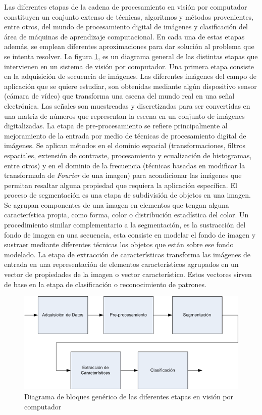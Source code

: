 \indent Las diferentes etapas de la cadena de procesamiento en visión por computador constituyen un conjunto extenso de técnicas, algoritmos y métodos provenientes, entre otros, del mundo de procesamiento digital de imágenes y clasificación del área de máquinas de aprendizaje computacional. En cada una de estas etapas además, se emplean diferentes aproximaciones para dar solución al problema que se intenta resolver. La figura \ref{fig:etapas_vision_computador}, es un diagrama general de las distintas etapas que intervienen en un sistema de visión por computador. Una primera etapa consiste en la adquisición de secuencia de imágenes. Las diferentes imágenes del campo de aplicación que se quiere estudiar, son obtenidas mediante algún dispositivo sensor (cámara de vídeo) que transforma una escena del mundo real en una señal electrónica. Las señales son muestreadas y discretizadas para ser convertidas en una matriz de números que representan la escena en un conjunto de imágenes digitalizadas. La etapa de pre-procesamiento se refiere principalmente al mejoramiento de la entrada por medio de técnicas de procesamiento digital de imágenes. Se aplican métodos en el dominio espacial (transformaciones, filtros espaciales, extensión de contraste, procesamiento y ecualización de histogramas, entre otros) y en el dominio de la frecuencia (técnicas basadas en modificar la transformada de \textit{Fourier} de una imagen) para acondicionar las imágenes que permitan resaltar alguna propiedad que requiera la aplicación específica. El proceso de segmentación es una etapa de subdivisión de objetos en una imagen. Se agrupan componentes de una imagen en elementos que tengan alguna característica propia, como forma, color o distribución estadística del color. Un procedimiento similar complementario a la segmentación, es la sustracción del fondo de imagen en una secuencia, esta consiste en modelar el fondo de imagen y sustraer mediante diferentes técnicas los objetos que están sobre ese fondo modelado. La etapa de extracción de características transforma las imágenes de entrada en una representación de elementos característicos agrupados en un vector de propiedades de la imagen o vector característico. Estos vectores sirven de base en la etapa de clasificación o reconocimiento de patrones. 



\begin{figure}[h!]
  \centering
      \includegraphics[scale=0.5]{img/ch1/generic_block_diagram_computer_vision}
  \caption[Diagrama de bloques etapas visión por computador]{Diagrama de bloques genérico de las diferentes etapas en visión por computador}
\label{fig:etapas_vision_computador}
\end{figure}

